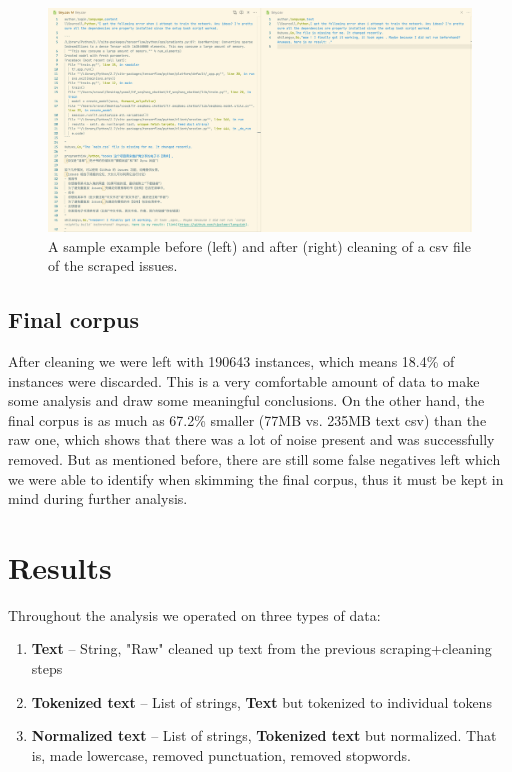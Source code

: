 \documentclass[]{article}
\begin{document}
\begin{figure}[H]
    \centering
    \includegraphics[width=1\textwidth]{cleaning-example.png}
    \caption{A sample example before (left) and after (right) cleaning of a csv file of the scraped issues.}
    \label{fig:cleaning-example}
\end{figure}

\subsection{Final corpus}

After cleaning we were left with 190643 instances, which means 18.4\% of instances were discarded. This is a very comfortable amount of data to make some analysis and draw some meaningful conclusions. On the other hand, the final corpus is as much as 67.2\% smaller (77MB vs. 235MB text csv) than the raw one, which shows that there was a lot of noise present and was successfully removed. But as mentioned before, there are still some false negatives left which we were able to identify when skimming the final corpus, thus it must be kept in mind during further analysis.

\section{Results}

Throughout the analysis we operated on three types of data:

\begin{enumerate}
    \item {\bf Text} -- String, "Raw" cleaned up text from the previous scraping+cleaning steps
    \item {\bf Tokenized text} -- List of strings, {\bf Text} but tokenized to individual tokens
    \item {\bf Normalized text} -- List of strings, {\bf Tokenized text} but normalized. That is, made lowercase, removed punctuation, removed stopwords.
\end{enumerate}
\end{document}
